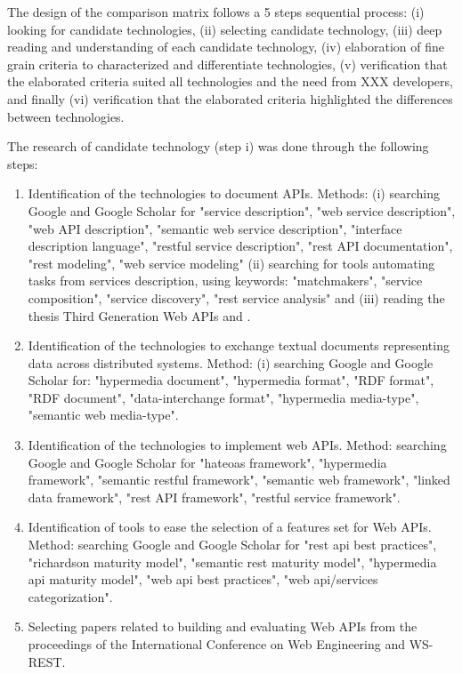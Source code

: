 

The design of the comparison matrix follows a 5 steps sequential process: (i) looking for candidate technologies, (ii) selecting candidate technology, (iii) deep reading and understanding of each candidate technology, (iv) elaboration of fine grain criteria to characterized and differentiate technologies, (v) verification that the elaborated criteria suited all technologies and the need from XXX developers, and finally (vi) verification that the elaborated criteria highlighted the differences between technologies.

The research of candidate technology (step i) was done through the following steps:

\begin{enumerate}
    \item Identification of the technologies to document APIs. Methods: (i) searching Google and Google Scholar for "service description", "web service description", "web API description", "semantic web service description", "interface description language", "restful service description", "rest API documentation", "rest modeling", "web service modeling" (ii) searching for tools automating tasks from services description, using keywords: "matchmakers", "service composition", "service discovery", "rest service analysis" and (iii) reading the thesis Third Generation Web APIs \cite{lanthalerthird} and \cite{scherer2016description}.
    \item Identification of the technologies to exchange textual documents representing data across distributed systems. Method: (i) searching Google and Google Scholar for: "hypermedia document", "hypermedia format", "RDF format", "RDF document", "data-interchange format", "hypermedia media-type", "semantic web media-type".
    \item Identification of the technologies to implement web APIs. Method: searching Google and Google Scholar for "hateoas framework", "hypermedia framework", "semantic restful framework", "semantic web framework", "linked data framework", "rest API framework", "restful service framework".
    \item Identification of tools to ease the selection of a features set for Web APIs. Method: searching Google and Google Scholar for "rest api best practices", "richardson maturity model", "semantic rest maturity model", "hypermedia api maturity model", "web api best practices", "web api/services categorization".
    \item Selecting papers related to building and evaluating Web APIs from the proceedings of the International Conference on Web Engineering and WS-REST.
\end{enumerate}

